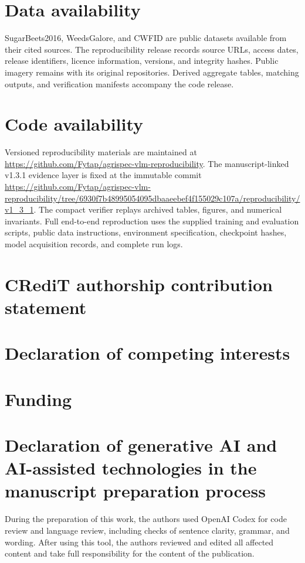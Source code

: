 \documentclass[preprint,12pt]{elsarticle}
\begin{document}
\section*{Data availability}
SugarBeets2016, WeedsGalore, and CWFID are public datasets available from their cited sources. The reproducibility release records source URLs, access dates, release identifiers, licence information, versions, and integrity hashes. Public imagery remains with its original repositories. Derived aggregate tables, matching outputs, and verification manifests accompany the code release.

\section*{Code availability}
Versioned reproducibility materials are maintained at \url{https://github.com/Fytap/agrispec-vlm-reproducibility}. The manuscript-linked v1.3.1 evidence layer is fixed at the immutable commit \url{https://github.com/Fytap/agrispec-vlm-reproducibility/tree/6930f7b48995054095dbaaeebef4f155029c107a/reproducibility/v1_3_1}. The compact verifier replays archived tables, figures, and numerical invariants. Full end-to-end reproduction uses the supplied training and evaluation scripts, public data instructions, environment specification, checkpoint hashes, model acquisition records, and complete run logs.

\ifCRediTStatementReady
\section*{CRediT authorship contribution statement}
\CRediTStatement
\fi

\ifCompetingInterestsReady
\section*{Declaration of competing interests}
\CompetingInterests
\fi

\ifFundingStatementReady
\section*{Funding}
\FundingStatement
\fi

\section*{Declaration of generative AI and AI-assisted technologies in the manuscript preparation process}
During the preparation of this work, the authors used OpenAI Codex for code review and language review, including checks of sentence clarity, grammar, and wording. After using this tool, the authors reviewed and edited all affected content and take full responsibility for the content of the publication.

\setlength{\bibsep}{0pt}
\footnotesize


\end{document}
